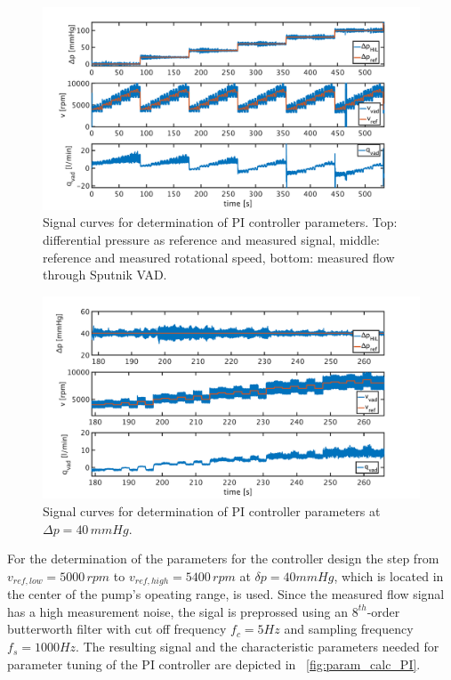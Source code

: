 \begin{figure}[ht]
  \centering
  \includegraphics[width=\textwidth]{images/chapt_5/dyn_measure.pdf}
  \caption[Signal curves for determination of PI controller parameters]{Signal curves for determination of PI controller parameters. Top: differential pressure as reference and measured signal, middle: reference and measured rotational speed, bottom: measured flow through Sputnik VAD.}
  \label{fig:dyn_meas}
\end{figure}

\begin{figure}[ht]
  \centering
  \includegraphics[width=\textwidth]{images/chapt_5/dyn_meas_40.pdf}
  \caption[Signal curves for determination of PI controller parameters at $\Delta{p}=40\,mmHg$]{Signal curves for determination of PI controller parameters at $\Delta{p}=40\,mmHg$.}
  \label{fig:dyn_meas_40}
\end{figure}

For the determination of the parameters for the controller design the step from $v_{ref,low}=5000\, rpm$ to $v_{ref,high}=5400\, rpm$ at $\delta{p}=40mmHg$, which is located in the center of the pump's opeating range, is used.
Since the measured flow signal has a high measurement noise, the sigal is preprossed using an $8^{th}$-order butterworth filter with cut off frequency $f_c=5Hz$ and sampling frequency $f_s=1000Hz$. The resulting signal and the characteristic parameters needed for parameter tuning of the PI controller are depicted in \figurename~\ref{fig:param_calc_PI}.

